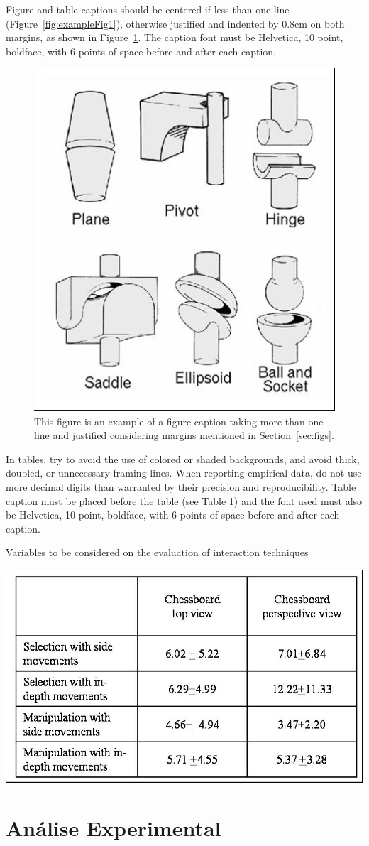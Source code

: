 \documentclass[12pt]{article}
\begin{document}
Figure and table captions should be centered if less than one line
(Figure~\ref{fig:exampleFig1}), otherwise justified and indented by 0.8cm on
both margins, as shown in Figure~\ref{fig:exampleFig2}. The caption font must
be Helvetica, 10 point, boldface, with 6 points of space before and after each
caption.



\begin{figure}[ht]
\centering
\includegraphics[width=.3\textwidth]{fig2.jpg}
\caption{This figure is an example of a figure caption taking more than one
  line and justified considering margins mentioned in Section~\ref{sec:figs}.}
\label{fig:exampleFig2}
\end{figure}

In tables, try to avoid the use of colored or shaded backgrounds, and avoid
thick, doubled, or unnecessary framing lines. When reporting empirical data,
do not use more decimal digits than warranted by their precision and
reproducibility. Table caption must be placed before the table (see Table 1)
and the font used must also be Helvetica, 10 point, boldface, with 6 points of
space before and after each caption.

\begin{table}[ht]
\centering
\caption{Variables to be considered on the evaluation of interaction
  techniques}
\label{tab:exTable1}
\includegraphics[width=.7\textwidth]{table.jpg}
\end{table}

\section{Análise Experimental}
\label{sec:experimentos}
\end{document}
